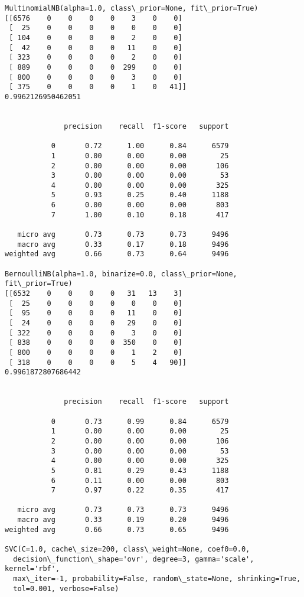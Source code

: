 \documentclass[11pt]{article}
\begin{document}
    \begin{Verbatim}[commandchars=\\\{\}]
MultinomialNB(alpha=1.0, class\_prior=None, fit\_prior=True)
[[6576    0    0    0    0    3    0    0]
 [  25    0    0    0    0    0    0    0]
 [ 104    0    0    0    0    2    0    0]
 [  42    0    0    0    0   11    0    0]
 [ 323    0    0    0    0    2    0    0]
 [ 889    0    0    0    0  299    0    0]
 [ 800    0    0    0    0    3    0    0]
 [ 375    0    0    0    0    1    0   41]]
0.9962126950462051


              precision    recall  f1-score   support

           0       0.72      1.00      0.84      6579
           1       0.00      0.00      0.00        25
           2       0.00      0.00      0.00       106
           3       0.00      0.00      0.00        53
           4       0.00      0.00      0.00       325
           5       0.93      0.25      0.40      1188
           6       0.00      0.00      0.00       803
           7       1.00      0.10      0.18       417

   micro avg       0.73      0.73      0.73      9496
   macro avg       0.33      0.17      0.18      9496
weighted avg       0.66      0.73      0.64      9496

BernoulliNB(alpha=1.0, binarize=0.0, class\_prior=None, fit\_prior=True)
[[6532    0    0    0    0   31   13    3]
 [  25    0    0    0    0    0    0    0]
 [  95    0    0    0    0   11    0    0]
 [  24    0    0    0    0   29    0    0]
 [ 322    0    0    0    0    3    0    0]
 [ 838    0    0    0    0  350    0    0]
 [ 800    0    0    0    0    1    2    0]
 [ 318    0    0    0    0    5    4   90]]
0.9961872807686442


              precision    recall  f1-score   support

           0       0.73      0.99      0.84      6579
           1       0.00      0.00      0.00        25
           2       0.00      0.00      0.00       106
           3       0.00      0.00      0.00        53
           4       0.00      0.00      0.00       325
           5       0.81      0.29      0.43      1188
           6       0.11      0.00      0.00       803
           7       0.97      0.22      0.35       417

   micro avg       0.73      0.73      0.73      9496
   macro avg       0.33      0.19      0.20      9496
weighted avg       0.66      0.73      0.65      9496

SVC(C=1.0, cache\_size=200, class\_weight=None, coef0=0.0,
  decision\_function\_shape='ovr', degree=3, gamma='scale', kernel='rbf',
  max\_iter=-1, probability=False, random\_state=None, shrinking=True,
  tol=0.001, verbose=False)

    \end{Verbatim}
\end{document}
